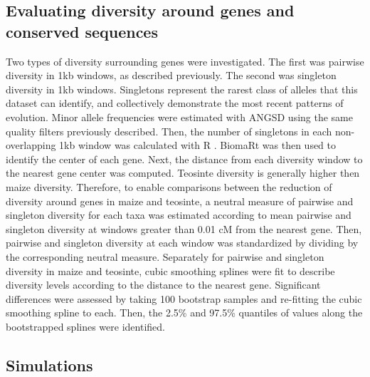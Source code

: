 \documentclass{pnastwo}
\begin{document}
\begin{article}
\begin{materials}
\subsection{Evaluating diversity around genes and conserved sequences}
Two types of diversity surrounding genes were investigated. The first
was pairwise diversity in 1kb windows, as described previously. The
second was singleton diversity in 1kb windows. Singletons represent
the rarest class of alleles that this dataset can identify, and
collectively demonstrate the most recent patterns of evolution. Minor
allele frequencies were estimated with ANGSD \cite{korneliussen2014} using the
same quality filters previously described. Then, the number of
singletons in each non-overlapping 1kb window was calculated with R
\cite{R2014}. BiomaRt \cite{durinck2009, durinck2005} was then used to identify
the center of each gene. Next, the distance from each diversity window
to the nearest gene center was computed. Teosinte diversity is
generally higher then maize diversity. Therefore, to enable comparisons between
the reduction of diversity around genes in maize and teosinte, a
neutral measure of pairwise and singleton diversity for each taxa was estimated according to
mean pairwise and singleton diversity at windows greater than 0.01 cM from the nearest
gene. Then, pairwise and singleton diversity at each window was
standardized by dividing by the corresponding neutral
measure. Separately for pairwise and singleton diversity in maize and
teosinte, cubic smoothing splines were fit to
describe diversity levels according to the distance to the nearest
gene. Significant differences were assessed by taking 100 bootstrap
samples and re-fitting the cubic smoothing spline to each. Then, the
2.5\% and 97.5\% quantiles of values along the bootstrapped splines
were identified.


\subsection{Simulations}

\end{materials}


\end{article}
\end{document}
